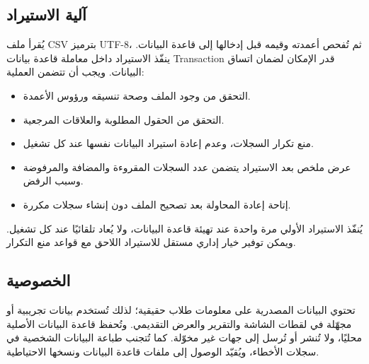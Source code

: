 \documentclass[12pt,a4paper]{article}
\begin{document}
\subsection{آلية الاستيراد}
يُقرأ ملف CSV بترميز UTF-8، ثم تُفحص أعمدته وقيمه قبل إدخالها إلى قاعدة البيانات. ينفّذ الاستيراد داخل معاملة قاعدة بيانات \textenglish{Transaction} قدر الإمكان لضمان اتساق البيانات. ويجب أن تتضمن العملية:
\begin{itemize}
\item التحقق من وجود الملف وصحة تنسيقه ورؤوس الأعمدة.
\item التحقق من الحقول المطلوبة والعلاقات المرجعية.
\item منع تكرار السجلات، وعدم إعادة استيراد البيانات نفسها عند كل تشغيل.
\item عرض ملخص بعد الاستيراد يتضمن عدد السجلات المقروءة والمضافة والمرفوضة وسبب الرفض.
\item إتاحة إعادة المحاولة بعد تصحيح الملف دون إنشاء سجلات مكررة.
\end{itemize}
يُنفّذ الاستيراد الأولي مرة واحدة عند تهيئة قاعدة البيانات، ولا يُعاد تلقائيًا عند كل تشغيل. ويمكن توفير خيار إداري مستقل للاستيراد اللاحق مع قواعد منع التكرار.

\subsection{الخصوصية}
تحتوي البيانات المصدرية على معلومات طلاب حقيقية؛ لذلك تُستخدم بيانات تجريبية أو مجهّلة في لقطات الشاشة والتقرير والعرض التقديمي. وتُحفظ قاعدة البيانات الأصلية محليًا، ولا تُنشر أو تُرسل إلى جهات غير مخوّلة. كما تُتجنب طباعة البيانات الشخصية في سجلات الأخطاء، ويُقيّد الوصول إلى ملفات قاعدة البيانات ونسخها الاحتياطية.
\end{document}

